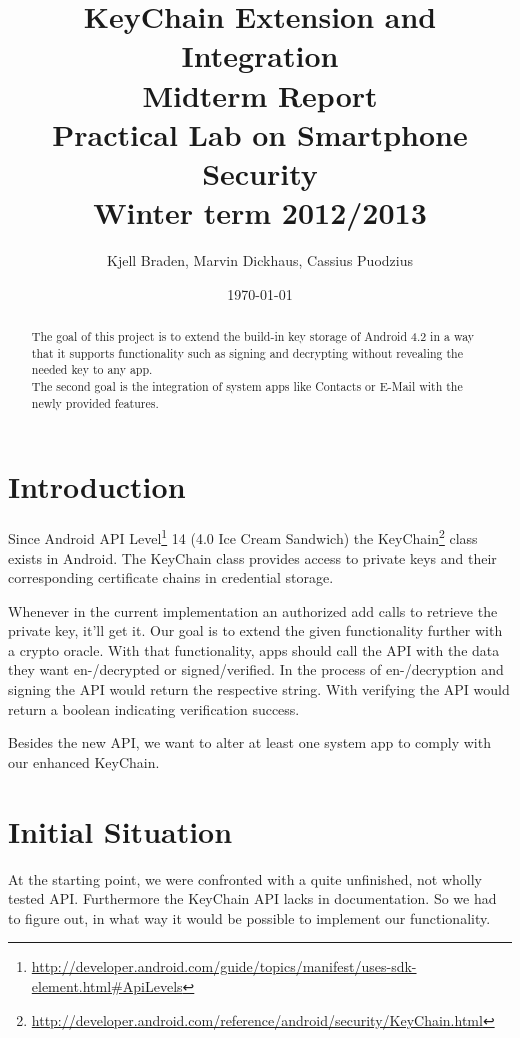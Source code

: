 \documentclass[a4paper,draft]{scrartcl}
\title{KeyChain Extension and Integration\\
	Midterm Report\\[4mm]
  \small{Practical Lab on Smartphone Security\\[2mm]
  Winter term 2012/2013}}
\author{Kjell Braden, Marvin Dickhaus, Cassius Puodzius}
\date{\today}
\begin{document}
\maketitle

\begin{abstract}
	The goal of this project is to extend the build-in key storage of Android 4.2 in a way that it supports functionality such as signing and decrypting without revealing the needed key to any app.\\
	The second goal is the integration of system apps like Contacts or E-Mail with the newly provided features.
\end{abstract}

\tableofcontents

\section{Introduction}
	Since Android API Level\footnote{\url{http://developer.android.com/guide/topics/manifest/uses-sdk-element.html\#ApiLevels}} 14 (4.0 Ice Cream Sandwich) the KeyChain\footnote{\url{http://developer.android.com/reference/android/security/KeyChain.html}} class exists in Android. The KeyChain class provides access to private keys and their corresponding certificate chains in credential storage.

	Whenever in the current implementation an authorized add calls to retrieve the private key, it'll get it. Our goal is to extend the given functionality further with a crypto oracle. With that functionality, apps should call the API with the data they want en-/decrypted or signed/verified. In the process of en-/decryption and signing the API would return the respective string. With verifying the API would return a boolean indicating verification success.

	Besides the new API, we want to alter at least one system app to comply with our enhanced KeyChain.

\section{Initial Situation}
	At the starting point, we were confronted with a quite unfinished, not wholly tested API. Furthermore the KeyChain API lacks in documentation. So we had to figure out, in what way it would be possible to implement our functionality.
\end{document}
